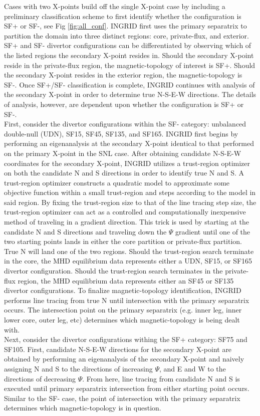 Cases with two X-points build off the single X-point case by including a preliminary classification scheme to first identify whether the configuration is SF+ or SF-, see Fig \ref{fig:all_conf}. INGRID first uses the primary separatrix to partition the domain into three distinct regions: core, private-flux, and exterior. SF+ and SF- divertor configurations can be differentiated by observing which of the listed regions the secondary X-point resides in. Should the secondary X-point reside in the private-flux region, the magnetic-topology of interest is SF+. Should the secondary X-point resides in the exterior region, the magnetic-topology is SF-. Once SF+/SF- classification is complete, INGRID continues with analysis of the secondary X-point in order to determine true N-S-E-W directions. The details of analysis, however, are dependent upon whether the configuration is SF+ or SF-.\\ \indent
First, consider the divertor configurations within the SF- category: unbalanced double-null (UDN), SF15, SF45, SF135, and SF165. INGRID first begins by performing an eigenanalysis at the secondary X-point identical to that performed on the primary X-point in the SNL case. After obtaining candidate N-S-E-W coordinates for the secondary X-point, INGRID utilizes a trust-region optimizer on both the candidate N and S directions in order to identify true N and S. A trust-region optimizer constructs a quadratic model to approximate some objective function within a small trust-region and steps according to the model in said region. By fixing the trust-region size to that of the line tracing step size, the trust-region optimizer can act as a controlled and computationally inexpensive method of traveling in a gradient direction. This trick is used by starting at the candidate N and S directions and traveling down the $\Psi$ gradient until one of the two starting points lands in either the core partition or private-flux partition. True N will land one of the two regions. Should the trust-region search terminate in the core, the MHD equilibrium data represents either a UDN, SF15, or SF165 divertor configuration. Should the trust-region search terminates in the private-flux region, the MHD equilibrium data represents either an SF45 or SF135 divertor configurations. To finalize magnetic-topology identification, INGRID performs line tracing from true N until intersection with the primary separatrix occurs. The intersection point on the primary separatrix (e.g. inner leg, inner lower core, outer leg, etc)  determines which magnetic-topology is being dealt with.\\ \indent
Next, consider the divertor configurations withing the SF+ category: SF75 and SF105. First, candidate N-S-E-W directions for the secondary X-point are obtained by performing an eigenanalysis of the secondary X-point and naively assigning N and S to the directions of increasing $\Psi$, and E and W to the directions of decreasing $\Psi$. From here, line tracing from candidate N and S is executed until primary separatrix intersection from either starting point occurs. Similar to the SF- case, the point of intersection with the primary separatrix determines which magnetic-topology is in question.